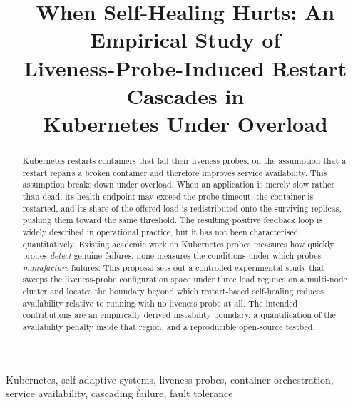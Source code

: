 \documentclass[conference]{IEEEtran}
\begin{document}
\title{When Self-Healing Hurts: An Empirical Study of\\
Liveness-Probe-Induced Restart Cascades in\\
Kubernetes Under Overload}

\author{
\and
{}
}

\maketitle

\begin{abstract}
Kubernetes restarts containers that fail their liveness probes, on the
assumption that a restart repairs a broken container and therefore
improves service availability. This assumption breaks down under
overload. When an application is merely slow rather than dead, its
health endpoint may exceed the probe timeout, the container is
restarted, and its share of the offered load is redistributed onto the
surviving replicas, pushing them toward the same threshold. The
resulting positive feedback loop is widely described in operational
practice, but it has not been characterised quantitatively. Existing
academic work on Kubernetes probes measures how quickly probes
\emph{detect} genuine failures; none measures the conditions under
which probes \emph{manufacture} failures. This proposal sets out a
controlled experimental study that sweeps the liveness-probe
configuration space under three load regimes on a multi-node cluster
and locates the boundary beyond which restart-based self-healing
reduces availability relative to running with no liveness probe at
all. The intended contributions are an empirically derived instability
boundary, a quantification of the availability penalty inside that
region, and a reproducible open-source testbed.
\end{abstract}

\begin{IEEEkeywords}
Kubernetes, self-adaptive systems, liveness probes, container
orchestration, service availability, cascading failure, fault
tolerance
\end{IEEEkeywords}
\end{document}
